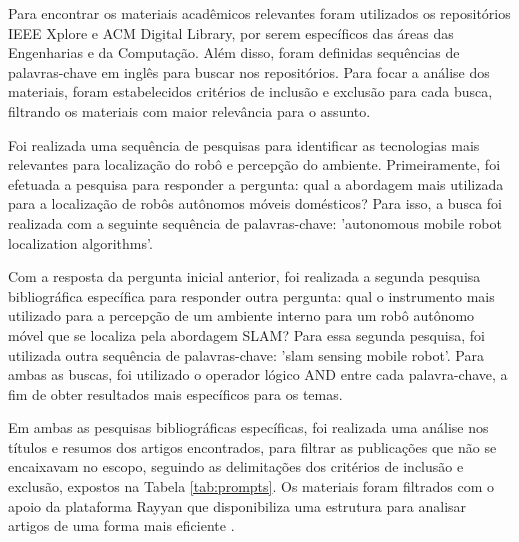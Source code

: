 Para encontrar os materiais acadêmicos relevantes foram utilizados os repositórios IEEE Xplore e ACM Digital Library, por serem específicos das áreas das Engenharias e da Computação. Além disso, foram definidas sequências de palavras-chave em inglês para buscar nos repositórios. Para focar a análise dos materiais, foram estabelecidos critérios de inclusão e exclusão para cada busca, filtrando os materiais com maior relevância para o assunto. 

Foi realizada uma sequência de pesquisas para identificar as tecnologias mais relevantes para localização do robô e percepção do ambiente. Primeiramente, foi efetuada a pesquisa para responder a pergunta: qual a abordagem mais utilizada para a localização de robôs autônomos móveis domésticos? Para isso, a busca foi realizada com a seguinte sequência de palavras-chave: 'autonomous mobile robot localization algorithms'. 

Com a resposta da pergunta inicial anterior, foi realizada a segunda pesquisa bibliográfica específica para responder outra pergunta: qual o instrumento mais utilizado para a percepção de um ambiente interno para um robô autônomo móvel que se localiza pela abordagem SLAM? Para essa segunda pesquisa, foi utilizada outra sequência de palavras-chave: 'slam sensing mobile robot'. Para ambas as buscas, foi utilizado o operador lógico AND entre cada palavra-chave, a fim de obter resultados mais específicos para os temas.

Em ambas as pesquisas bibliográficas específicas, foi realizada uma análise nos títulos e resumos dos artigos encontrados, para filtrar as publicações que não se encaixavam no escopo, seguindo as delimitações dos critérios de inclusão e exclusão, expostos na Tabela \ref{tab:prompts}. Os materiais foram filtrados com o apoio da plataforma Rayyan que disponibiliza uma estrutura para analisar artigos de uma forma mais eficiente \cite{rayyan}. 

